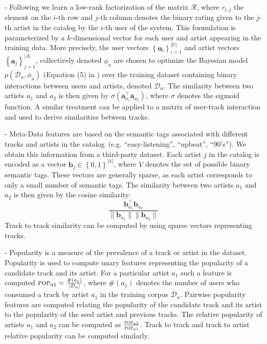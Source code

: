  -
Following \cite{xbox-www} we learn a low-rank factorization of the matrix $\mathcal{R}$,
 where $r_{i,j}$ the element on the $i$-th row and $j$-th column denotes the binary rating given to the $j$-th artist in the catalog by the $i$-th user of the system. This formulation is parameterized by a $k$-dimensional vector for each user and artist appearing in the training data. More precisely, the user vectors $\left\{\mathbf{u}_i\right\}_{i=1}^{|U|}$ and artist vectors $\left\{\mathbf{a}_j\right\}_{j=1}^{|A|}$, collectively denoted $\phi_u$ are chosen to optimize the Bayesian model $p(\mathcal{D}_u,\phi_u)$ (Equation (5) in \cite{xbox-www}) over the training dataset containing binary interactions between users and artists, denoted $\mathcal{D}_u$.  The similarity between two artists $a_1$ and $a_2$ is then given by $\sigma \left(\mathbf{a}_{a_1}^\top\mathbf{a}_{a_2}\right)$, where $\sigma$ denotes the sigmoid function. A similar treatment can be applied to a matrix of user-track interaction and used to derive similarities between tracks.

 -
Meta-Data features are based on the semantic tags associated with different tracks and artists in the catalog~(e.g. ``easy-listening'', ``upbeat'', ``90's''). We obtain this information from a third-party dataset. Each artist $j$ in the catalog is  encoded as a vector $\mathbf{b}_j \in \left\{0,1\right\}^{|V|}$, where $V$ denotes the set of  possible binary semantic tags. These vectors are generally sparse, as each artist corresponds to only a small number of semantic tags.  The similarity between two artists $a_1$ and $a_2$ is then given by the cosine similarity: 
\begin{equation}\frac{\mathbf{b}_{a_1}^\top\mathbf{b}_{a_2}}{\parallel\mathbf{b}_{a_1}\parallel\parallel\mathbf{b}_{a_2}\parallel}
\end{equation}
Track to track similarity can be computed by using sparse vectors representing tracks.

 -
Popularity is a measure of the prevalence of a track or artist in the dataset.
Popularity is used to compute unary features representing the popularity of a candidate track and its artist. For a particular artist $a_1$ such a feature is computed $\textsc{pop}_{a1}=\frac{\#\left(a_1\right)}{|\mathcal{D}_u|}$, where $\#\left(a_1\right)$ denotes the number of users who consumed a track by artist $a_1$  in the training corpus $\mathcal{D}_u$. Pairwise popularity features are computed relating the popularity of the candidate track and its artist to the popularity of the seed artist and previous tracks. The relative popularity of artists $a_1$ and $a_2$ can be computed as $\frac{\textsc{pop}_{a2}}{\textsc{pop}_{a1}}$. Track to track and track to artist relative popularity can be computed similarly.


